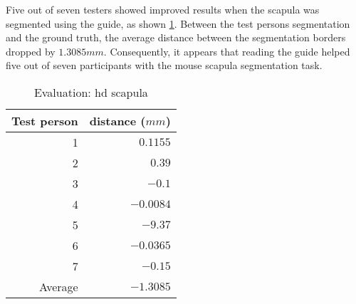\noindent
Five out of seven testers showed improved results when the scapula was segmented using the guide, as shown \cref{tab:scapula-distance}.
Between the test persons segmentation and the ground truth, the average distance between the segmentation borders dropped by $1.3085mm$.
Consequently, it appears that reading the guide helped five out of seven participants with the mouse scapula segmentation task.
\begin{table}[ht]
	\begin{center}
		\begin{tabular}{r r}
			\textbf{Test person} & \textbf{distance ($mm$)} \\
			\hline
			1                    & $0.1155$                 \\
			2                    & $0.39$                   \\
			3                    & $-0.1$                   \\
			4                    & $-0.0084$                \\
			5                    & $-9.37$                  \\
			6                    & $-0.0365$                \\
			7                    & $-0.15$                  \\
			\hline
			Average              & $-1.3085$                \\
		\end{tabular}
		\caption{Evaluation: \acrshort{hd} scapula}\label{tab:scapula-distance}
	\end{center}
\end{table}


